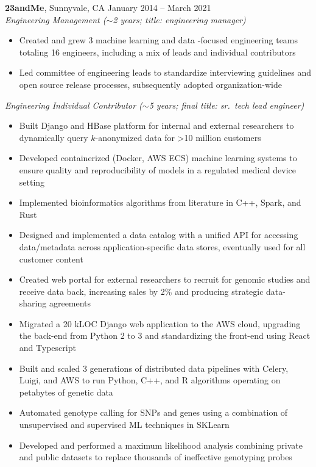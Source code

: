 \documentclass[margin,line]{resume}
\begin{document}
\begin{resume}
    \textbf{23andMe}, Sunnyvale, CA \hfill\vspace{1mm}\hfill January 2014 -- March 2021\\%
    \textsl{Engineering Management (\(\sim\)2 years; title: engineering manager)}
    \begin{itemize}
    \item Created and grew 3 machine learning and data -focused engineering teams totaling 16 engineers, including a mix of leads and individual contributors
    \item Led committee of engineering leads to standardize interviewing guidelines and open source release processes, subsequently adopted organization-wide
    \end{itemize}
    \textsl{Engineering Individual Contributor (\(\sim\)5 years; final title: sr.\ tech lead engineer)}
    \begin{itemize}
    \item Built Django and HBase platform for internal and external researchers to dynamically query \(k\)-anonymized data for \textgreater 10 million customers
    \item Developed containerized (Docker, AWS ECS) machine learning systems to ensure quality and reproducibility of models in a regulated medical device setting
    \item Implemented bioinformatics algorithms from literature in C++, Spark, and Rust
    \item Designed and implemented a data catalog with a unified API for accessing data/metadata across application-specific data stores, eventually used for all customer content
    \item Created web portal for external researchers to recruit for genomic studies and receive data back, increasing sales by 2\% and producing strategic data-sharing agreements
    \item Migrated a 20 kLOC Django web application to the AWS cloud, upgrading the back-end from Python 2 to 3 and standardizing the front-end using React and Typescript
    \item Built and scaled 3 generations of distributed data pipelines with Celery, Luigi, and AWS to run Python, C++, and R algorithms operating on petabytes of genetic data
    \item Automated genotype calling for SNPs and genes using a combination of unsupervised and supervised ML techniques in SKLearn
    \item Developed and performed a maximum likelihood analysis combining private and public datasets to replace thousands of ineffective genotyping probes
    \end{itemize}
    

\end{resume}
\end{document}
